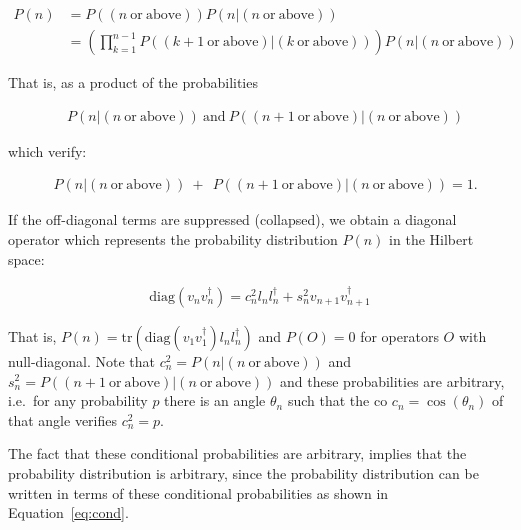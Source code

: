 \documentclass[11pt]{book}
\begin{document}
\begin{equation}\begin{aligned}
  P(n)&=P((n\mathrm{\ or\ above}))P(n| (n \mathrm{\ or\ above}))\\
  &=\left(\prod\limits_{k=1}^{n-1} P((k+1 \mathrm{\ or\ above})|(k \mathrm{\ or\ above}))\right)P(n| (n \mathrm{\ or\ above}))\end{aligned}\end{equation}

That is, as a product of the probabilities

\begin{equation}\begin{aligned}
&P(n|(n \mathrm{\ or\ above}))\mathrm{\ and\ }P((n+1 \mathrm{\ or\ above})|(n \mathrm{\ or\ above}))\end{aligned}\end{equation}

which verify:

\begin{equation}\begin{aligned}
&P(n|(n \mathrm{\ or\ above}))\ +\ \ 
P((n+1 \mathrm{\ or\ above})|(n \mathrm{\ or\ above}))=1.\end{aligned}\end{equation}

If the off-diagonal terms are suppressed (collapsed), we obtain a
diagonal operator which represents the probability distribution \(P(n)\)
in the Hilbert space:

\begin{equation}\begin{aligned}
  \mathrm{diag}(v_nv_n^\dagger)=c_n^2 l_nl_n^\dagger+s_n^2 v_{n+1}v_{n+1}^\dagger\end{aligned}\end{equation}

That is,
\(P(n)=\mathrm{tr}(\mathrm{diag}(v_1v_1^\dagger) l_nl_n^\dagger)\) and
\(P(O)=0\) for operators \(O\) with null-diagonal. Note that
\(c_n^2=P(n| (n \mathrm{\ or\ above}))\) and
\(s_n^2=P((n+1 \mathrm{\ or\ above})| (n \mathrm{\ or\ above}))\) and
these probabilities are arbitrary, i.e.~for any probability \(p\) there
is an angle \(\theta_n\) such that the co \(c_n=\cos(\theta_n)\) of that
angle verifies \(c_n^2=p\).

The fact that these conditional probabilities are arbitrary, implies
that the probability distribution is arbitrary, since the probability
distribution can be written in terms of these conditional probabilities
as shown in Equation~\protect\hyperlink{eq:cond}{{[}eq:cond{]}}.
\end{document}
